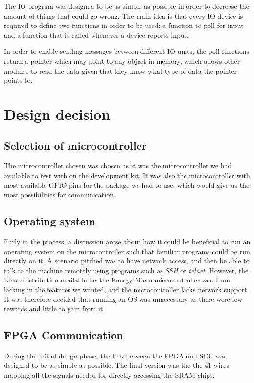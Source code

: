 The IO program was designed to be as simple as possible in order to decrease the amount of things that could go wrong.
The main idea is that every IO device is required to define two functions in order to be used: a function to poll for input and a function that is called whenever a device reports input.

In order to enable sending messages between different IO units, the poll functions return a pointer which may point to any object in memory, which allows other modules to read the data given that they know what type of data the pointer points to.

\section{Design decision}
\subsection{Selection of microcontroller}
The microcontroller chosen was chosen as it was the microcontroller we had available to test with on the development kit.
It was also the microcontroller with most available GPIO pins for the package we had to use, which would give us the most possibilities for communication.

\subsection{Operating system}
Early in the process, a discussion arose about how it could be beneficial to run an operating system on the microcontroller such that familiar programs could be run directly on it.
A scenario pitched was to have network access, and then be able to talk to the machine remotely using programs such as \textit{SSH} or \textit{telnet}.
However, the Linux distribution available for the Energy Micro microcontroller was found lacking in the features we wanted, and the microcontroller lacks network support.
It was therefore decided that running an OS was unnecessary as there were few rewards and little to gain from it.

\subsection{FPGA Communication}
During the initial design phase, the link between the FPGA and SCU was designed to be as simple as possible.
The final version was the the 41 wires mapping all the signals needed for directly accessing the SRAM chips.


